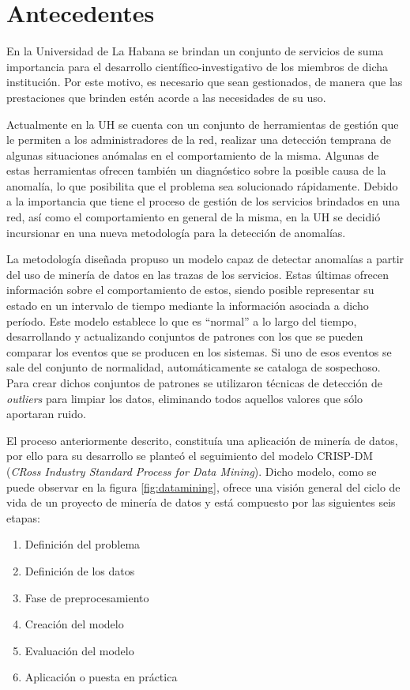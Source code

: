 \chapter{Antecedentes}
\label{chap:background_project}
  En la Universidad de La Habana se brindan un conjunto de servicios de suma
importancia para el desarrollo científico-investigativo de los miembros de dicha
institución. Por este motivo, es necesario que sean gestionados, de manera que
las prestaciones que brinden estén acorde a las necesidades de su uso. 

Actualmente en la UH se cuenta con un conjunto de herramientas de gestión que le
permiten a los administradores de la red, realizar una detección temprana de
algunas situaciones anómalas en el comportamiento de la misma. Algunas de estas
herramientas ofrecen también un diagnóstico sobre la posible causa de la
anomalía, lo que posibilita que el problema sea solucionado rápidamente. Debido
a la importancia que tiene el proceso de gestión de los servicios brindados en
una red, así como el comportamiento en general de la misma, en la UH se decidió
incursionar en una nueva metodología para la detección de anomalías. 

La metodología diseñada\cite{Gonzalez2008} propuso un modelo capaz de detectar
anomalías a partir del uso de minería de datos en las trazas de los servicios.
Estas últimas ofrecen información sobre el comportamiento de estos, siendo
posible representar su estado en un intervalo de tiempo mediante la información
asociada a dicho período. Este modelo establece lo que es ``normal'' a lo largo
del tiempo, desarrollando y actualizando conjuntos de patrones con los que se
pueden comparar los eventos que se producen en los sistemas. Si uno de esos
eventos se sale del conjunto de normalidad, automáticamente se cataloga de
sospechoso. Para crear dichos conjuntos de patrones se utilizaron técnicas de
detección de \textit{outliers} para limpiar los datos, eliminando todos aquellos
valores que sólo aportaran ruido. 

El proceso anteriormente descrito, constituía una aplicación de minería de
datos, por ello para su desarrollo se planteó el seguimiento del modelo CRISP-DM
(\textit{CRoss Industry Standard Process for Data Mining})\cite{Wirth2000,
Hipp2002, Cios2005, Cios2010}. Dicho modelo, como se puede observar en la figura
\ref{fig:datamining}, ofrece una visión general del ciclo de vida de un proyecto
de minería de datos y está compuesto por las siguientes seis etapas:
\begin{enumerate}
 \item Definición del problema
 \item Definición de los datos
 \item Fase de preprocesamiento
 \item Creación del modelo
 \item Evaluación del modelo
 \item Aplicación o puesta en práctica
\end{enumerate}

